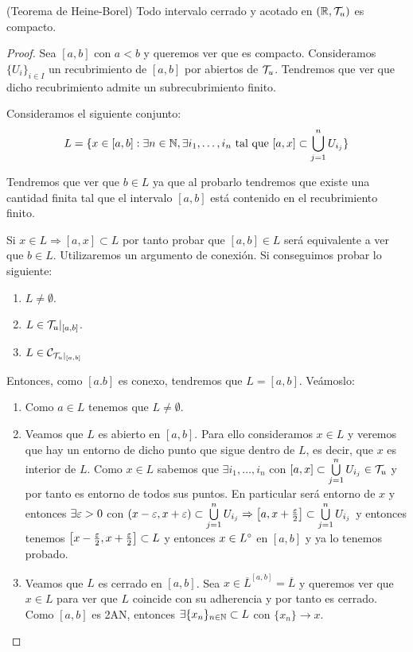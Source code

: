 \begin{teo}
    (Teorema de Heine-Borel) Todo intervalo cerrado y acotado en $(\mathbb{R}, \mathcal{T}_u)$ es compacto.

    \begin{proof}
        Sea $[a,b]$ con $a<b$ y queremos ver que es compacto. Consideramos $\{U_i\}_{i\in I}$ un recubrimiento de $[a,b]$ por abiertos de $\mathcal{T}_u$. Tendremos que ver que dicho recubrimiento admite un subrecubrimiento finito. 

        Consideramos el siguiente conjunto: 
        \begin{align*}
            L=\{x\in [a,b] : \exists n\in \mathbb{N}, \exists i_1,\dots,i_n \text{ tal que } [a,x]\subset \bigcup\limits_{j=1}^n U_{i_j}\}
        \end{align*}

        Tendremos que ver que $b\in L$ ya que al probarlo tendremos que existe una cantidad finita tal que el intervalo $[a,b]$ está contenido en el recubrimiento finito. 

        Si $x\in L\Rightarrow [a,x]\subset L$ por tanto probar que $[a,b]\in L$ será equivalente a ver que $b\in L$. Utilizaremos un argumento de conexión. Si conseguimos probar lo siguiente:
        \begin{enumerate}
            \item[(i)] $L\neq \emptyset$.
            \item[(ii)] $L\in \mathcal{T}_u|_{[a,b]}$.
            \item[(iii)] $L\in \mathcal{C}_{\mathcal{T}_u|_{[a,b]}}$
        \end{enumerate}
        Entonces, como $[a.b]$ es conexo, tendremos que $L=[a,b]$. Veámoslo:

        \begin{enumerate}
            \item[(i)] Como $a\in L$ tenemos que $L\neq \emptyset$.
            \item[(ii)] Veamos que $L$ es abierto en $[a,b]$. Para ello consideramos $x\in L$ y veremos que hay un entorno de dicho punto que sigue dentro de $L$, es decir, que $x$ es interior de $L$. Como $x\in L$ sabemos que $\exists i_1,\dots,i_n$ con $[a,x]\subset \bigcup\limits_{j=1}^n U_{i_j}\in \mathcal{T}_u$ y por tanto es entorno de todos sus puntos. En particular será entorno de $x$ y entonces $\exists \varepsilon >0$ con $(x-\varepsilon,x+\varepsilon)\subset \bigcup\limits_{j=1}^n U_{i_j}\Rightarrow \left[a,x+\frac{\varepsilon}{2}\right]\subset \bigcup\limits_{j=1}^n U_{i_j}$ y entonces tenemos $\left[x-\frac{\varepsilon}{2}, x+\frac{\varepsilon}{2}\right]\subset L$ y entonces $x\in L^\circ$ en $[a,b]$ y ya lo tenemos probado.
            \item[(iii)] Veamos que $L$ es cerrado en $[a,b]$. Sea $x\in \overline{L}^{[a,b]} = \overline{L}$ y queremos ver que $x\in L$ para ver que $L$ coincide con su adherencia y por tanto es cerrado. Como $[a,b]$ es 2AN, entonces $\exists \{x_n\}_{n\in \mathbb{N}}\subset L $ con $\{x_n\}\to x$. 
            

\end{enumerate}
\end{proof}
\end{teo}
